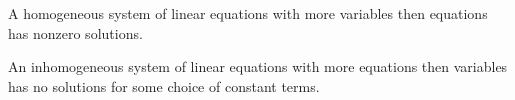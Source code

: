   \setcounter{thm}{25}
  \begin{thm}
    A homogeneous system of linear equations with more variables then equations has nonzero solutions.
  \end{thm}

  \setcounter{thm}{27}
  \begin{thm}
    An inhomogeneous system of linear equations with more equations then variables has no solutions for some choice of constant terms.
  \end{thm}

